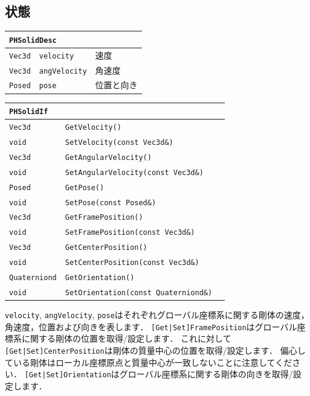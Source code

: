 \subsection*{状態}

\begin{center}
\begin{tabular}{p{.15\hsize}p{.45\hsize}p{.30\hsize}}
\multicolumn{3}{l}{\texttt{PHSolidDesc}}							\\ \midrule
\texttt{Vec3d}	&	\texttt{velocity}		& 速度					\\
\texttt{Vec3d}	&	\texttt{angVelocity}	& 角速度				\\
\texttt{Posed}	&	\texttt{pose}			& 位置と向き			\\
\end{tabular}
\end{center}

\begin{center}
\begin{tabular}{p{.2\hsize}p{.5\hsize}p{.20\hsize}}
\multicolumn{3}{l}{\texttt{PHSolidIf}}									\\ \midrule
\texttt{Vec3d}			& \texttt{GetVelocity()}						& \\
\texttt{void} 			& \texttt{SetVelocity(const Vec3d\&)}			& \\
\texttt{Vec3d} 			& \texttt{GetAngularVelocity()}					& \\
\texttt{void} 			& \texttt{SetAngularVelocity(const Vec3d\&)}	& \\
\texttt{Posed} 			& \texttt{GetPose()}							& \\
\texttt{void} 			& \texttt{SetPose(const Posed\&)}				& \\
\texttt{Vec3d} 			& \texttt{GetFramePosition()}					& \\
\texttt{void} 			& \texttt{SetFramePosition(const Vec3d\&)}		& \\
\texttt{Vec3d} 			& \texttt{GetCenterPosition()}					& \\
\texttt{void} 			& \texttt{SetCenterPosition(const Vec3d\&)}		& \\
\texttt{Quaterniond} 	& \texttt{GetOrientation()}						& \\
\texttt{void} 			& \texttt{SetOrientation(const Quaterniond\&)}	& \\
\end{tabular}
\end{center}

\texttt{velocity}, \texttt{angVelocity}, \texttt{pose}はそれぞれグローバル座標系に関する剛体の速度，角速度，位置および向きを表します．
\texttt{[Get|Set]FramePosition}はグローバル座標系に関する剛体の位置を取得/設定します．
\KLUDGE これに対して\texttt{[Get|Set]CenterPosition}は剛体の質量中心の位置を取得/設定します．
\KLUDGE 偏心している剛体はローカル座標原点と質量中心が一致しないことに注意してください．
\texttt{[Get|Set]Orientation}はグローバル座標系に関する剛体の向きを取得/設定します．


